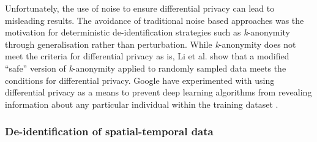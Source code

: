 

Unfortunately, the use of noise to ensure differential privacy can lead to misleading results. The avoidance of traditional noise based approaches was the motivation for deterministic de-identification strategies such as \textit{k}-anonymity through generalisation rather than perturbation. While \textit{k}-anonymity does not meet the criteria for differential privacy as is, Li et al. \cite{Li2011} show that a modified ``safe'' version of \textit{k}-anonymity applied to randomly sampled data meets the conditions for differential privacy. Google have experimented with using differential privacy as a means to prevent deep learning algorithms from revealing information about any particular individual within the training dataset \cite{Abadi2016}.


\subsubsection{De-identification of spatial-temporal data}
\label{sec:deidentification-of-spatial-data}


